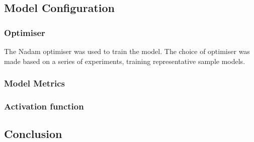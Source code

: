 \subsection{Model Configuration}

\subsubsection{Optimiser}
The Nadam optimiser was used to train the model. The choice of optimiser was made based on a series of experiments, training representative sample models.  

\subsubsection{Model Metrics}


\subsubsection{Activation function}

\FloatBarrier
\subsection{Conclusion}
